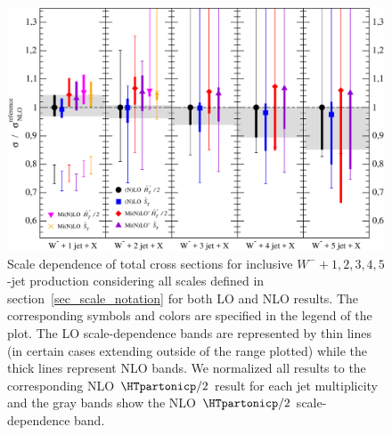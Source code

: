 \begin{figure}[p]
\begin{center}
\includegraphics[clip,scale=0.65]{plots/multi_scales_Wm}
\end{center}
\caption{Scale dependence of total cross sections for inclusive
$W^-+1,2,3,4,5$-jet production considering all scales defined in
section~\ref{sec_scale_notation} for both LO and NLO results. The corresponding symbols and colors are specified in the legend of the plot. The LO scale-dependence bands are represented by thin lines (in certain cases extending outside of
the range plotted) while the thick lines represent NLO bands. We
normalized all
results to the corresponding NLO $\HTpartonicp/2$ result for each jet
multiplicity and the gray bands show the NLO $\HTpartonicp/2$ scale-dependence band.}
\label{fig_Wp_all_scales}
\end{figure}



